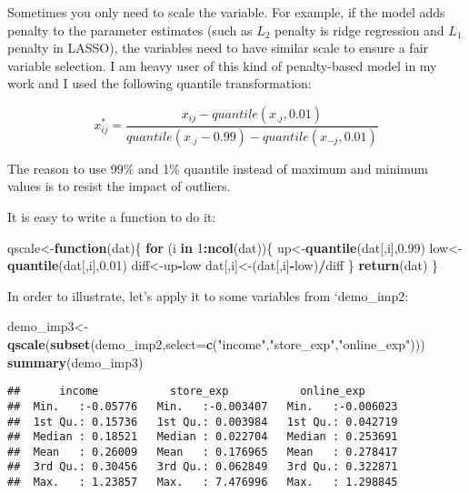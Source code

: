 \documentclass[
]{article}
\newenvironment{Shaded}{\begin{snugshade}}{\end{snugshade}}
\newcommand{\ControlFlowTok}[1]{\textcolor[rgb]{0.13,0.29,0.53}{\textbf{#1}}}
\newcommand{\DataTypeTok}[1]{\textcolor[rgb]{0.13,0.29,0.53}{#1}}
\newcommand{\DecValTok}[1]{\textcolor[rgb]{0.00,0.00,0.81}{#1}}
\newcommand{\FloatTok}[1]{\textcolor[rgb]{0.00,0.00,0.81}{#1}}
\newcommand{\KeywordTok}[1]{\textcolor[rgb]{0.13,0.29,0.53}{\textbf{#1}}}
\newcommand{\NormalTok}[1]{#1}
\newcommand{\OperatorTok}[1]{\textcolor[rgb]{0.81,0.36,0.00}{\textbf{#1}}}
\newcommand{\StringTok}[1]{\textcolor[rgb]{0.31,0.60,0.02}{#1}}
\begin{document}
Sometimes you only need to scale the variable. For example, if the model
adds penalty to the parameter estimates (such as \(L_2\) penalty is
ridge regression and \(L_1\) penalty in LASSO), the variables need to
have similar scale to ensure a fair variable selection. I am heavy user
of this kind of penalty-based model in my work and I used the following
quantile transformation:

\[
x_{ij}^{*}=\frac{x_{ij}-quantile(x_{.j},0.01)}{quantile(x_{.j}-0.99)-quantile(x_{-j},0.01)}
\]

The reason to use 99\% and 1\% quantile instead of maximum and minimum
values is to resist the impact of outliers.

It is easy to write a function to do it:

\begin{Shaded}
\begin{Highlighting}[]
\NormalTok{qscale<-}\ControlFlowTok{function}\NormalTok{(dat)\{}
  \ControlFlowTok{for}\NormalTok{ (i }\ControlFlowTok{in} \DecValTok{1}\OperatorTok{:}\KeywordTok{ncol}\NormalTok{(dat))\{}
\NormalTok{    up<-}\KeywordTok{quantile}\NormalTok{(dat[,i],}\FloatTok{0.99}\NormalTok{)}
\NormalTok{    low<-}\KeywordTok{quantile}\NormalTok{(dat[,i],}\FloatTok{0.01}\NormalTok{)}
\NormalTok{    diff<-up}\OperatorTok{-}\NormalTok{low}
\NormalTok{    dat[,i]<-(dat[,i]}\OperatorTok{-}\NormalTok{low)}\OperatorTok{/}\NormalTok{diff}
\NormalTok{  \}}
  \KeywordTok{return}\NormalTok{(dat)}
\NormalTok{\}}
\end{Highlighting}
\end{Shaded}

In order to illustrate, let's apply it to some variables from
`demo\_imp2:

\begin{Shaded}
\begin{Highlighting}[]
\NormalTok{demo_imp3<-}\KeywordTok{qscale}\NormalTok{(}\KeywordTok{subset}\NormalTok{(demo_imp2,}\DataTypeTok{select=}\KeywordTok{c}\NormalTok{(}\StringTok{"income"}\NormalTok{,}\StringTok{"store_exp"}\NormalTok{,}\StringTok{"online_exp"}\NormalTok{)))}
\KeywordTok{summary}\NormalTok{(demo_imp3)}
\end{Highlighting}
\end{Shaded}

\begin{verbatim}
##      income           store_exp           online_exp       
##  Min.   :-0.05776   Min.   :-0.003407   Min.   :-0.006023  
##  1st Qu.: 0.15736   1st Qu.: 0.003984   1st Qu.: 0.042719  
##  Median : 0.18521   Median : 0.022704   Median : 0.253691  
##  Mean   : 0.26009   Mean   : 0.176965   Mean   : 0.278417  
##  3rd Qu.: 0.30456   3rd Qu.: 0.062849   3rd Qu.: 0.322871  
##  Max.   : 1.23857   Max.   : 7.476996   Max.   : 1.298845
\end{verbatim}
\end{document}
